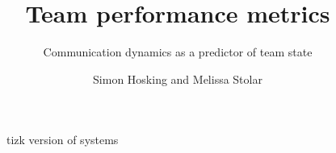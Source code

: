 \documentclass[aspectratio=43, notes]{beamer}
\author{Simon Hosking and Melissa Stolar}
\title{Team performance metrics}
\subtitle{Communication dynamics as a predictor of team state}
\institute{Human Factors\\
	Aerospace Division}
\begin{document}
\maketitle

%

\begin{frame}
\begin{figure}
	\caption{tizk version of systems}
	\label{fig:tsystems}
\end{figure}
\end{frame}


\end{document}
